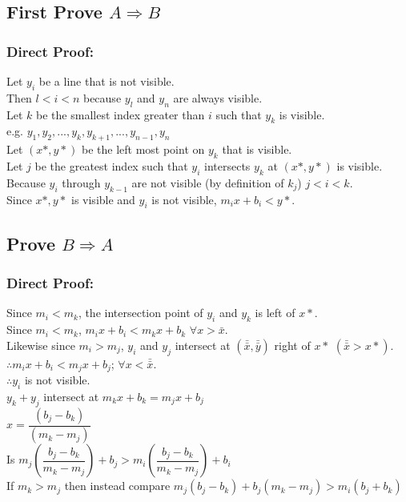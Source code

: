 \documentclass{article}
\begin{document}
\subsection*{First Prove $A \Rightarrow B$}
    \subsubsection*{Direct Proof:}
    Let $y_i$ be a line that is not visible.\\
    Then $l < i < n$ because $y_l$ and $y_n$ are always visible.\\
    Let $k$ be the smallest index greater than $i$ such that $y_k$ is visible.\\
    e.g. $y_1,y_2,...,y_k,y_{k+1},...,y_{n-1},y_n$\\
    Let $(x*,y*)$ be the left most point on $y_k$ that is visible.\\
    Let $j$ be the greatest index such that $y_i$ intersects $y_k$ at $(x*,y*)$ is visible.\\
    Because $y_i$ through $y_{k-1}$ are not visible (by definition of $k_j$) $j < i < k$.\\
    Since $x*,y*$ is visible and $y_i$ is not visible, $m_i x + b_i < y*$.
    
\subsection*{Prove $B \Rightarrow A$}
    \subsubsection*{Direct Proof:}
    Since $m_i < m_k$, the intersection point of $y_i$ and $y_k$ is left of $x*$.\\
    Since $m_i < m_k$, $m_i x + b_i < m_k x + b_k$ $\forall{x > \bar{x}}$.\\
    Likewise since $m_i > m_j$, $y_i$ and $y_j$ intersect at $(\bar{\bar{x}}, \bar{\bar{y}})$ right of $x*$ $(\bar{\bar{x}} > x*)$.\\
    $\therefore m_i x + b_i < m_j x + b_j$; $\forall{x < \bar{\bar{x}}}$.\\
    $\therefore y_i$ is not visible.\\
    $y_k + y_j$ intersect at $m_k x + b_k = m_j x + b_j$\\
    $x = \dfrac{(b_j - b_k)}{(m_k - m_j)}$\\
    Is $m_j \left( \dfrac{b_j - b_k}{m_k - m_j}\right) + b_j > m_i \left(\dfrac{b_j - b_k}{m_k - m_j}\right) + b_i$\\
    If $m_k > m_j$ then instead compare $m_j (b_j - b_k) + b_j (m_k - m_j) > m_i (b_j + b_k)$
\end{document}
